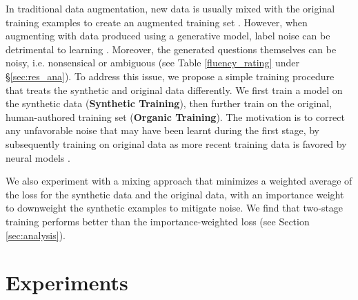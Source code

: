 \documentclass[11pt,a4paper]{article}
\begin{document}
In traditional data augmentation, new data is usually mixed with the original training examples to create an augmented training set \cite{wei-zou-2019-eda,kafle-etal-2017-data}. 
However, when augmenting with data produced using a generative model, label noise can be detrimental to learning \cite{kafle-etal-2017-data}. 
Moreover, the generated questions themselves can be noisy, i.e. nonsensical or ambiguous (see Table \ref{fluency_rating} under \S\ref{sec:res_ana}). 
To address this issue, we propose a simple training procedure that treats the synthetic and original data differently.
We first train a model on the synthetic data (\textbf{Synthetic Training}), then further train on the original, human-authored training set (\textbf{Organic Training}). 
The motivation is to correct any unfavorable noise that may have been learnt during the first stage, by subsequently training on original data as more recent training data is favored by neural models \cite{Goodfellow2014AnEI} . 

We also experiment with a mixing approach that minimizes a weighted average of the loss for the synthetic data and the original data, with an importance weight to downweight the synthetic examples to mitigate noise.
We find that two-stage training performs better than the importance-weighted loss
(see Section \ref{sec:analysis}).
 \section{Experiments}
\label{ref:sec-exp}
\end{document}
